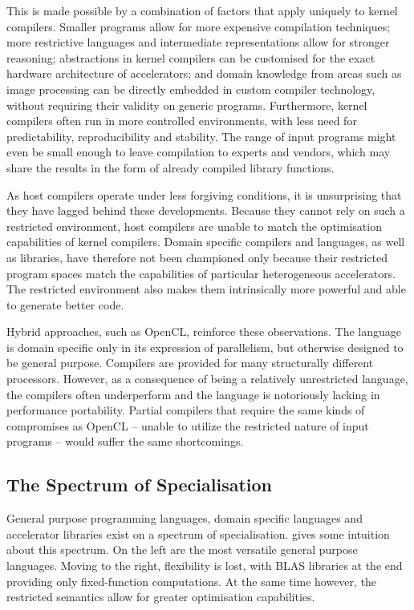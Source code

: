     This is made possible by a combination of factors that apply uniquely to
    kernel compilers.
    Smaller programs allow for more expensive compilation techniques;
    more restrictive languages and intermediate representations allow for
    stronger reasoning;
    abstractions in kernel compilers can be customised for the exact hardware
    architecture of accelerators;
    and domain knowledge from areas such as image processing can be directly
    embedded in custom compiler technology, without requiring their validity
    on generic programs.
    Furthermore, kernel compilers often run in more controlled environments,
    with less need for predictability, reproducibility and stability.
    The range of input programs might even be small enough to leave compilation
    to experts and vendors, which may share the results in the form of already
    compiled library functions.

    As host compilers operate under less forgiving conditions, it is
    unsurprising that they have lagged behind these developments.
    Because they cannot rely on such a restricted environment, host compilers
    are unable to match the optimisation capabilities of kernel compilers.
    Domain specific compilers and languages, as well as libraries, have
    therefore not been championed only because their restricted program
    spaces match the capabilities of particular heterogeneous accelerators.
    The restricted environment also makes them intrinsically more powerful and
    able to generate better code.

    Hybrid approaches, such as OpenCL, reinforce these observations.
    The language is domain specific only in its expression of parallelism, but
    otherwise designed to be general purpose.
    Compilers are provided for many structurally different processors.
    However, as a consequence of being a relatively unrestricted language, the
    compilers often underperform and the language is notoriously lacking in
    performance portability.
    Partial compilers that require the same kinds of compromises as OpenCL --
    unable to utilize the restricted nature of input programs -- would suffer
    the same shortcomings.

\subsection{The Spectrum of Specialisation}

    General purpose programming languages, domain specific languages and
    accelerator libraries exist on a spectrum of specialisation.
     gives some intuition about this spectrum.
    On the left are the most versatile general purpose languages.
    Moving to the right, flexibility is lost, with BLAS libraries at the end
    providing only fixed-function computations.
    At the same time however, the restricted semantics allow for greater 
    optimisation capabilities.

